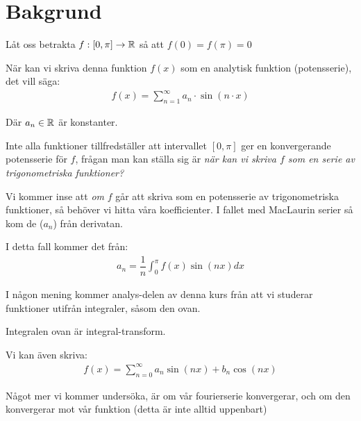 \section{Bakgrund}\par
\noindent Låt oss betrakta $f:[0,\pi]\to\mathbb{R}$ så att $f(0) = f(\pi) = 0$\par
\noindent När kan vi skriva denna funktion $f(x)$ som en analytisk funktion (potensserie), det vill säga:
\begin{equation}
  \begin{gathered}
    f(x) = \sum_{n=1}^{\infty} a_n\cdot\sin(n\cdot x)
  \end{gathered}
\end{equation}\par
\noindent Där $a_n\in\mathbb{R}$ är konstanter.
\par\bigskip
\noindent Inte alla funktioner tillfredställer att intervallet $[0,\pi]$ ger en konvergerande potensserie för $f$, frågan man kan ställa sig är \textit{när kan vi skriva $f$ som en serie av trigonometriska funktioner?} 
\par\bigskip
\noindent Vi kommer inse att \textit{om} $f$ går att skriva som en potensserie av trigonometriska funktioner, så behöver vi hitta våra koefficienter. I fallet med MacLaurin serier så kom de ($a_n$) från derivatan.\par
\noindent I detta fall kommer det från:
\begin{equation*}
  \begin{gathered}
    a_n  = \dfrac{1}{n}\int_{0}^{\pi}f(x)\sin(nx)dx
  \end{gathered}
\end{equation*}
\par\bigskip
\noindent I någon mening kommer analys-delen av denna kurs från att vi studerar funktioner utifrån integraler, såsom den ovan.\par
\noindent Integralen ovan är integral-transform. 
\par\bigskip
\noindent Vi kan även skriva:
\begin{equation*}
  \begin{gathered}
    f(x) = \sum_{n=0}^{\infty}a_n\sin(nx)+b_n\cos(nx)
  \end{gathered}
\end{equation*}
\par\bigskip
\noindent Något mer vi kommer undersöka, är om vår fourierserie konvergerar, och om den konvergerar mot vår funktion (detta är inte alltid uppenbart)
\par\bigskip
